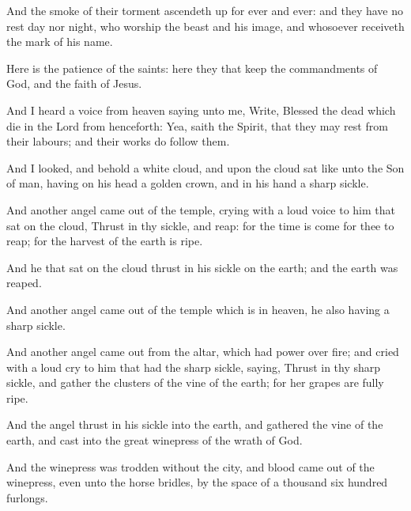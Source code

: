 {And the
smoke of
their
torment ascendeth
up
for
ever
and
ever:
and they
have
no
rest
day nor
night,
who
worship the
beast
and
his
image,
and
whosoever
receiveth the
mark of
his
name.

Here
is the
patience of the
saints:
here
{}
they that
keep the
commandments of
God,
and the
faith of
Jesus.

And I
heard a
voice
from
heaven
saying unto
me,
Write,
Blessed
{} the
dead
which
die
in the
Lord from
henceforth:
Yea,
saith the
Spirit,
that they may
rest
from
their
labours;
and
their
works do
follow
them.


\par }{\PP {}And I
looked,
and
behold a
white
cloud,
and
upon the
cloud
{}
sat like
unto the
Son of
man,
having
on
his
head a
golden
crown,
and
in
his
hand a
sharp
sickle.

And
another
angel
came out
of the
temple,
crying
with a
loud
voice to
him that
sat
on the
cloud, Thrust
in
thy
sickle,
and
reap:
for the
time is
come for
thee to
reap;
for the
harvest of the
earth is
ripe.

And
he that
sat
on the
cloud
thrust in
his
sickle
on the
earth;
and the
earth was
reaped.

And
another
angel
came out
of the
temple which
is
in
heaven,
he
also
having a
sharp
sickle.

And
another
angel
came out
from the
altar, which
had
power
over
fire;
and
cried with a
loud
cry to
him that
had the
sharp
sickle,
saying, Thrust
in
thy
sharp
sickle,
and
gather the
clusters of the
vine of the earth;
for
her
grapes are fully
ripe.

And the
angel thrust
in
his
sickle
into the
earth,
and
gathered the
vine of the
earth,
and
cast
{}
into the
great
winepress of the
wrath of
God.

And the
winepress was
trodden
without the
city,
and
blood
came out
of the
winepress, even
unto the
horse
bridles, by the space
of a
thousand
{} six
hundred
furlongs.




\par }
